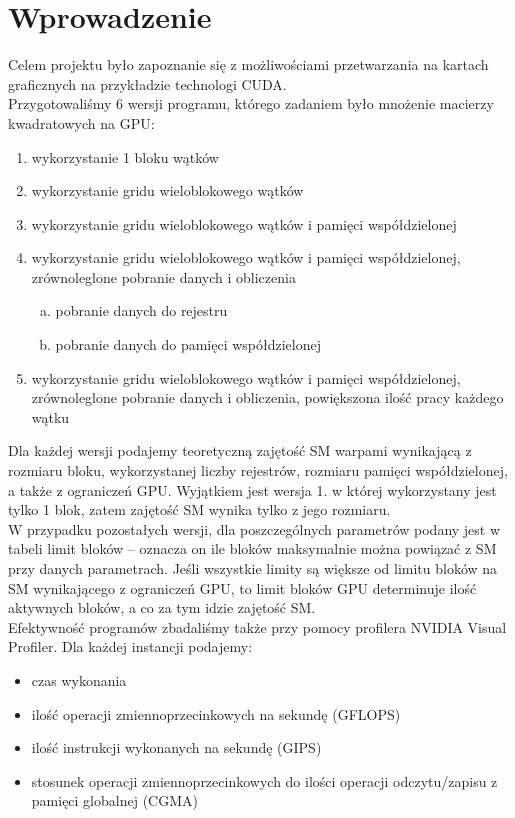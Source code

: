 \section{Wprowadzenie}

Celem projektu było zapoznanie się z możliwościami przetwarzania na kartach graficznych na przykładzie technologi CUDA.\\
Przygotowaliśmy 6 wersji programu, którego zadaniem było mnożenie macierzy kwadratowych na GPU:
\begin{enumerate}
\item wykorzystanie 1 bloku wątków
\item wykorzystanie gridu wieloblokowego wątków
\item wykorzystanie gridu wieloblokowego wątków i pamięci współdzielonej
\item wykorzystanie gridu wieloblokowego wątków i pamięci współdzielonej, zrównoleglone pobranie danych i obliczenia
\begin{enumerate}[(a)]
\item pobranie danych do rejestru
\item pobranie danych do pamięci współdzielonej
\end{enumerate}
\item wykorzystanie gridu wieloblokowego wątków i pamięci współdzielonej, zrównoleglone pobranie danych i obliczenia, powiększona ilość pracy każdego wątku
\end{enumerate}

Dla każdej wersji podajemy teoretyczną zajętość SM warpami wynikającą z rozmiaru bloku, wykorzystanej liczby rejestrów, rozmiaru pamięci współdzielonej, a także z ograniczeń GPU\@. Wyjątkiem jest wersja 1. w której wykorzystany jest tylko 1 blok, zatem zajętość SM wynika tylko z jego rozmiaru.\\
W przypadku pozostałych wersji, dla poszczególnych parametrów podany jest w tabeli limit bloków -- oznacza on ile bloków maksymalnie można powiązać z SM przy danych parametrach. Jeśli wszystkie limity są większe od limitu bloków na SM wynikającego z ograniczeń GPU, to limit bloków GPU determinuje ilość aktywnych bloków, a co za tym idzie zajętość SM.\\
Efektywność programów zbadaliśmy także przy pomocy profilera NVIDIA Visual Profiler. Dla każdej instancji podajemy:
\begin{itemize}
\item czas wykonania
\item ilość operacji zmiennoprzecinkowych na sekundę (GFLOPS)
\item ilość instrukcji wykonanych na sekundę (GIPS)
\item stosunek operacji zmiennoprzecinkowych do ilości operacji odczytu/zapisu z pamięci globalnej (CGMA)
\end{itemize}

